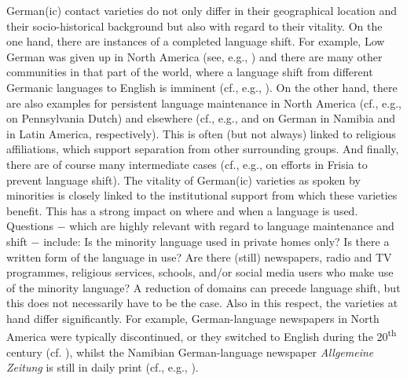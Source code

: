 \documentclass[output=paper]{langsci/langscibook}
\begin{document}
German(ic) contact varieties do not only differ in their geographical location and their socio-historical background but also with regard to their vitality. On the one hand, there are instances of a completed language shift. For example, Low German was given up in North America (see, e.g., ) and there are many other communities in that part of the world, where a language shift from different Germanic languages to English is imminent (cf., e.g., \citealt{page_moribund_2015}). On the other hand, there are also examples for persistent language maintenance in North America (cf., e.g., \citealt{Louden2016} on Pennsylvania Dutch) and elsewhere (cf., e.g., \citealt{shah_german_2018} and \citealt{rosenberg_lateinamerika_2018} on German in Namibia and in Latin America, respectively). This is often (but not always) linked to religious affiliations, which support separation from other surrounding groups. And finally, there are of course many intermediate cases (cf., e.g.,  on efforts in Frisia to prevent language shift). The vitality of German(ic) varieties as spoken by minorities is closely linked to the institutional support from which these varieties benefit. This has a strong impact on where and when a language is used. Questions $-$ which are highly relevant with regard to language maintenance and shift $-$ include: Is the minority language used in private homes only? Is there a written form of the language in use? Are there (still) newspapers, radio and TV programmes, religious services, schools, and/or social media users who make use of the minority language? A reduction of domains can precede language shift, but this does not necessarily have to be the case. Also in this respect, the varieties at hand differ significantly. For example, German-language newspapers in North America were typically discontinued, or they switched to English during the 20\textsuperscript{th} century (cf. ), whilst the Namibian German-language newspaper \textit{Allgemeine Zeitung} is still in daily print (cf., e.g., \citealt{shah_german_2018}).
\end{document}
